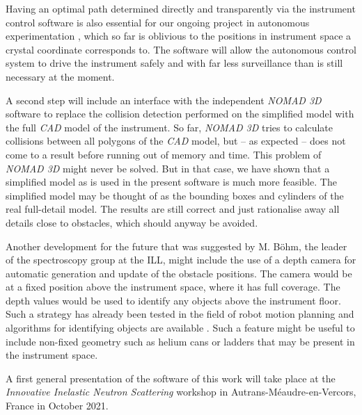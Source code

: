 Having an optimal path determined directly and transparently via the instrument control software
is also essential for our ongoing project in autonomous experimentation \cite{Noack2021}, which
so far is oblivious to the positions in instrument space a crystal coordinate corresponds to.
The software will allow the autonomous control system \cite{web_gpcam} to drive the instrument safely
and with far less surveillance than is still necessary at the moment.

A second step will include an interface with the independent \textit{NOMAD 3D} \cite{web_NOMAD3d}
software to replace the collision detection performed on the simplified model with the full \textit{CAD}
model \cite{ThalesModel2021} of the instrument.
So far, \textit{NOMAD 3D} tries to calculate collisions between all polygons of the \textit{CAD} model, 
but -- as expected -- does not come to a result before running out of memory and time.
This problem of \textit{NOMAD 3D} might never be solved. 
But in that case, we have shown that a simplified model as is used in the present software is much more 
feasible. 
The simplified model may be thought of as the bounding boxes and cylinders of the real full-detail model.
The results are still correct and just rationalise away all details close to obstacles, which should
anyway be avoided.

Another development for the future that was suggested by M. B\"ohm, the leader of the spectroscopy 
group at the ILL, might include the use of a depth camera for automatic generation and update 
of the obstacle positions. The camera would be at a fixed position above the instrument
space, where it has full coverage. The depth values would be used to identify any objects above the
instrument floor. Such a strategy has already been tested in the field of robot motion planning and 
algorithms for identifying objects are available \cite{Biswas2012}.
Such a feature might be useful to include non-fixed geometry such as helium cans or ladders
that may be present in the instrument space.

A first general presentation of the software of this work will take place at the 
\textit{Innovative Inelastic Neutron Scattering} workshop in Autrans-M\'eaudre-en-Vercors, France 
in October 2021.
